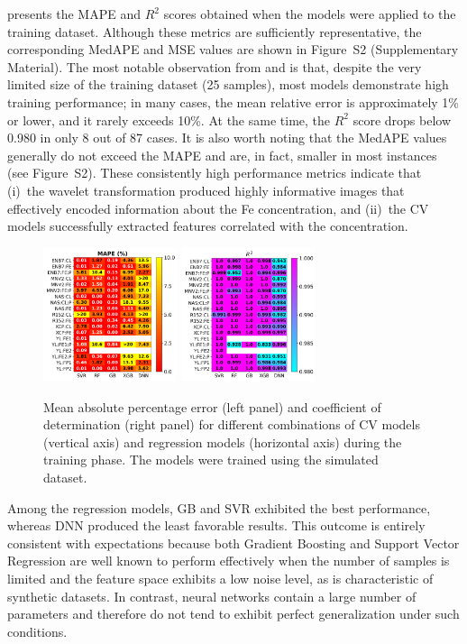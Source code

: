 \documentclass[10pt]{iopart}
\begin{document}
 presents the MAPE and $R^2$ scores obtained when the models were applied to the training dataset.
Although these metrics are sufficiently representative, the corresponding MedAPE and MSE values are shown in Figure~S2 (Supplementary Material).
The most notable observation from  and  is that,
despite the very limited size of the training dataset (25 samples),
most models demonstrate high training performance;
in many cases, the mean relative error is approximately 1\% or lower,
and it rarely exceeds 10\%. At the same time, the $R^2$ score drops below 0.980 in only 8 out of 87 cases.
It is also worth noting that the MedAPE values generally do not exceed the MAPE and are, in fact,
smaller in most instances (see Figure~S2).
These consistently high performance metrics indicate that
(i)~the wavelet transformation produced highly informative images that effectively encoded information about the Fe concentration,
and (ii)~the CV models successfully extracted features correlated with the concentration.

\begin{figure}
\centering
\includegraphics[width=0.35\textwidth]{Fig5a}
\includegraphics[width=0.35\textwidth]{Fig5b}
\caption{
Mean absolute percentage error (left panel) and coefficient of determination (right panel) for different combinations of CV models (vertical axis)
and regression models (horizontal axis) during the training phase. 
The models were trained using the simulated dataset.
}\label{Fig5}
\end{figure}

Among the regression models, GB and SVR exhibited the best performance,
whereas DNN produced the least favorable results.
This outcome is entirely consistent with expectations
because both Gradient Boosting and Support Vector Regression are well known to perform effectively
when the number of samples is limited and the feature space exhibits a low noise level, as is characteristic of synthetic datasets.
In contrast, neural networks contain a large number of parameters and therefore do not tend to exhibit perfect generalization under such conditions.
\end{document}
